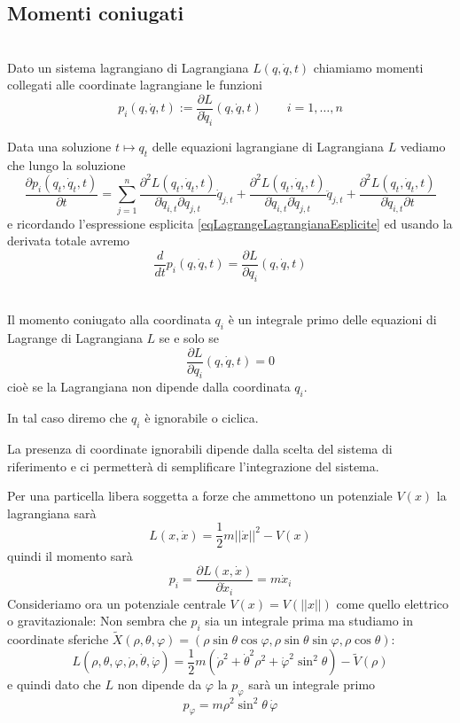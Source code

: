 \documentclass[11pt,a4paper,twoside]{book}
\newenvironment{proposizione}[1][\empty]{\begin{Proposizione}{
\ifx\empty#1\relax\else\mdseries\itshape#1\\\fi
}{}}{\end{Proposizione}}
\newenvironment{definizione}[1][\empty]{\begin{Definizione}{
\ifx\empty#1\relax\else\mdseries\itshape#1\\\fi
}{}}{\end{Definizione}}
\newenvironment{esempio}[1][Esempio]{ 
  \begin{center}\begin{tcolorbox}[
  title={#1:\\},
  width=0.9\linewidth,
  flush right,
  enhanced jigsaw, 
  colback=white, 
  frame hidden, 
  sharpish corners, arc=3mm,
  borderline west = {1pt}{0pt}{gray},
  borderline south = {1pt}{0pt}{gray},
  coltitle=black, 
  fonttitle=\small\bfseries, 
  attach title to upper, 
  breakable,
  top=2.5pt, bottom=0.3pt]\small
  }{
 \normalsize \end{tcolorbox}\end{center}
}
\theoremstyle{esss}
\theoremstyle{dotless}
\numberwithin{equation}{section} %
\begin{document}
\subsection{Momenti coniugati}
\begin{definizione}
Dato un sistema lagrangiano di Lagrangiana $L(q,\dot{q},t)$ chiamiamo momenti collegati alle coordinate lagrangiane le funzioni
\[
p_i(q,\dot{q},t):=\dfrac{\partial L}{\partial \dot{q}_i}(q,\dot{q},t) \qquad i=1,\dots, n
\]
\end{definizione}
Data una soluzione $t\mapsto q_t$ delle equazioni lagrangiane di Lagrangiana $L$ vediamo che lungo la soluzione
\[
\dfrac{\partial p_i(q_t,\dot{q}_t,t)}{\partial t}=\sum_{j=1}^n\dfrac{\partial^2 L(q_t,\dot{q}_t,t)}{\partial \dot{q}_{i,t} \partial q_{j,t}}\dot{q}_{j,t}+\dfrac{\partial^2 L(q_t,\dot{q}_t,t)}{\partial \dot{q}_{i,t} \partial \dot{q}_{j,t}}\ddot{q}_{j,t} + \dfrac{\partial^2 L(q_t,\dot{q}_t,t)}{\partial \dot{q}_{i,t} \partial t}
\]
e ricordando l'espressione esplicita \eqref{eqLagrangeLagrangianaEsplicite} ed usando la derivata totale avremo
\[
\dfrac{d}{dt}p_i(q,\dot{q},t)=\dfrac{\partial L}{\partial q_i} (q,\dot{q},t)
\]
\begin{proposizione}
Il momento coniugato alla coordinata $q_i$ è un integrale primo delle equazioni di Lagrange di Lagrangiana $L$ se e solo se \[\dfrac{\partial L}{\partial q_i}(q,\dot{q},t)=0\] cioè se la Lagrangiana non dipende dalla coordinata $q_i$.

In tal caso diremo che $q_i$ è ignorabile o ciclica.
\end{proposizione}

La presenza di coordinate ignorabili dipende dalla scelta del sistema di riferimento e ci permetterà di semplificare l'integrazione del sistema.

\begin{esempio}[Momento di una particella libera]
Per una particella libera soggetta a forze che ammettono un potenziale $V(x)$ la lagrangiana sarà
\[
L(x,\dot{x})=\dfrac{1}{2}m\left|\left|\dot{x}\right|\right|^2-V(x)
\]
quindi il momento sarà
\[
p_i=\dfrac{\partial L(x,\dot{x})}{\partial \dot{x}_i}=m\dot{x}_i
\]
Consideriamo ora un potenziale centrale $V(x)=V(\left|\left|x\right|\right|)$ come quello elettrico o gravitazionale: Non sembra che $p_i$ sia un integrale prima ma studiamo in coordinate sferiche $\tilde{X}(\rho,\theta,\varphi)=(\rho\sin{\theta}\cos{\varphi},\rho\sin{\theta}\sin{\varphi},\rho\cos{\theta})$:
\[
L(\rho,\theta,\varphi,\dot{\rho},\dot{\theta},\dot{\varphi})=\dfrac{1}{2}m\left(\dot{\rho}^2+\dot{\theta}^2\rho^2+\dot{\varphi}^2\sin^2{\theta} \right)-\tilde{V}(\rho)
\]
e quindi dato che $L$ non dipende da $\varphi$ la $p_\varphi$ sarà un integrale primo
\[
p_\varphi=m\rho^2\sin^2{\theta}\,\dot{\varphi}
\]
\end{esempio}
\end{document}
